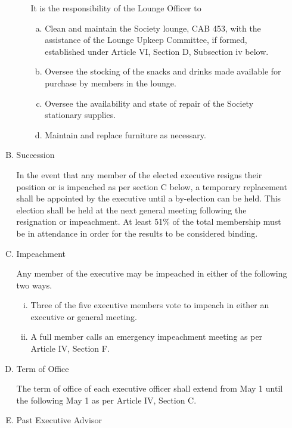 \documentclass[11pt]{article}
\begin{document}
\begin{enumerate}[I.]
\begin{enumerate}[A)]
\begin{enumerate}[i)]
          It is the responsibility of the Lounge Officer to
            \begin{enumerate}[a)]
              \item Clean and maintain the Society lounge, CAB 453, with the
                assistance of the Lounge Upkeep Committee, if formed,
                established under Article VI, Section D, Subsection iv below. 
              \item Oversee the stocking of the snacks and drinks made
                available for purchase by members in the lounge.
              \item Oversee the availability and state of repair of the Society
                stationary supplies. 
              \item Maintain and replace furniture as necessary. 
            \end{enumerate} 
        \end{enumerate}
        \item Succession
        
        In the event that any member of the elected executive resigns their
        position or is impeached as per section C below, a temporary
        replacement shall be appointed by the executive until a by-election can
        be held. This election shall be held at the next general meeting
        following the resignation or impeachment. At least 51\% of the total
        membership must be in attendance in order for the results to be
        considered binding. 
        \item Impeachment
        
        Any member of the executive may be impeached in either of the following two ways.
          \begin{enumerate}[i)]
            \item Three of the five executive members vote to impeach in either
              an executive or general meeting.
            \item A full member calls an emergency impeachment meeting as per
              Article IV, Section F.
          \end{enumerate}
        \item Term of Office
        
        The term of office of each executive officer shall extend from May 1
        until the following May 1 as per Article IV, Section C. 
        \item Past Executive Advisor
        

\end{enumerate}
\end{enumerate}
\end{document}
